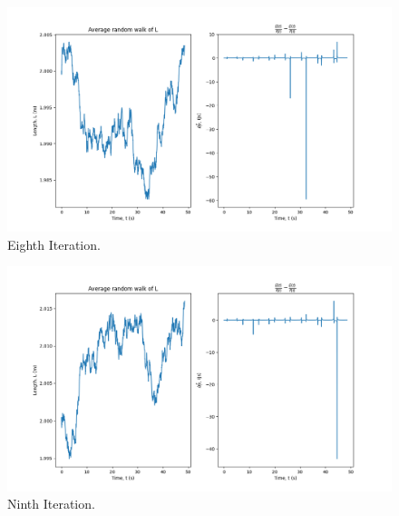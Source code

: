 \documentclass[10pt, twocolumn]{article}
\begin{document}
\begin{figure}
    \centering
    \includegraphics[width = \columnwidth]{Projects/ForcedSimplePendulum/Plots/simplified m = 1.0, L0= 2.0, k = 1000, g = 9.81, F = 20, sigma = 1e-10, run number 7.png}
    \caption{Eighth Iteration.}
    \label{fig:enter-label}
\end{figure}

\begin{figure}
    \centering
    \includegraphics[width = \columnwidth]{Projects/ForcedSimplePendulum/Plots/simplified m = 1.0, L0= 2.0, k = 1000, g = 9.81, F = 20, sigma = 1e-10, run number 8.png}
    \caption{Ninth Iteration.}
    \label{fig:enter-label}
\end{figure}
\end{document}
